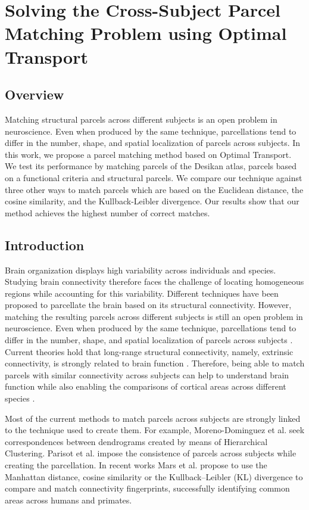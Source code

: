 \chapter{Solving the Cross-Subject Parcel Matching Problem using Optimal Transport}
%
\section{Overview}
Matching structural parcels across different subjects is an open problem in neuroscience.
Even when produced by the same technique, parcellations tend to differ in the number, shape, and spatial localization of parcels across subjects.
In this work, we propose a parcel matching method based on Optimal Transport.
We test its performance by matching parcels of the Desikan atlas, parcels based on a functional criteria and structural parcels.
We compare our technique against three other ways to match parcels which are based on the Euclidean distance, the cosine similarity, and the Kullback-Leibler divergence.
Our results show that our method achieves the highest number of correct matches.

\section{Introduction}
Brain organization displays high variability across individuals and species. Studying brain connectivity therefore faces the challenge of locating homogeneous regions while accounting for this variability. Different techniques have been proposed to parcellate the brain based on its structural connectivity. However, matching the resulting parcels across different subjects is still an open problem in neuroscience. Even when produced by the same technique, parcellations tend to differ in the number, shape, and spatial localization of parcels across subjects \cite{Jbabdi2013}. Current theories hold that long-range structural connectivity, namely, extrinsic connectivity, is strongly related to brain function \cite{Passingham2002}. Therefore, being able to match parcels with similar connectivity across subjects can help to understand brain function while also enabling the comparisons of cortical areas across different species \cite{Mars2018}.

Most of the current methods to match parcels across subjects are strongly linked to the technique used to create them. For example, Moreno-Dominguez et al. \cite{Moreno-Dominguez2014} seek correspondences between dendrograms created by means of Hierarchical Clustering. Parisot et al. \cite{Paristot2015} impose the consistence of parcels across subjects while creating the parcellation. In recent works Mars et al. propose to use the Manhattan distance, cosine similarity \cite{Mars2016} or the Kullback–Leibler (KL) divergence \cite{Mars2018} to compare and match connectivity fingerprints, successfully identifying common areas across humans and primates.

